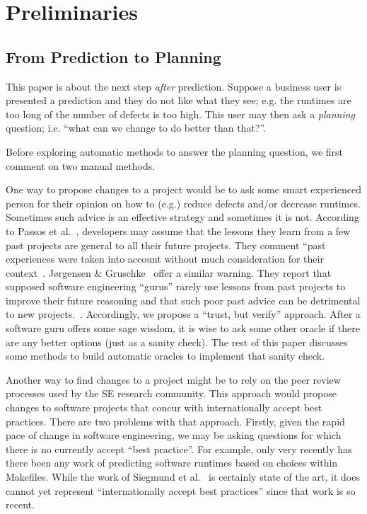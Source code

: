 \documentclass{sig-alternate}
\begin{document}
\section{Preliminaries}\label{sect:prelim}

\subsection{From Prediction to Planning}
 
 
This paper is about the next step {\em after} prediction. Suppose
a business user is presented a prediction and they do not like what they see; e.g. the runtimes are too long of the number of defects is too high. This user may
then ask a {\em planning}  question; i.e. ``what can we change to do better than that?''.

 

Before exploring automatic methods to answer the planning question, we first comment
on two manual methods.

One way to propose changes to a project would be to   ask some smart experienced
person for their opinion on how to (e.g.) reduce defects and/or decrease runtimes. Sometimes
such advice 
is an effective strategy and sometimes it is not.
According to Passos et al.~\cite{passos11},  developers
may  assume that the lessons they learn from a few past
projects are general to 
all their future projects. They comment ``past experiences were taken into account without 
much consideration for their context~\cite{passos11}.  
 J{\o}rgensen \& Gruschke~\cite{jorgensen09} offer  a similar warning. They report that 
  supposed software engineering    ``gurus'' rarely use lessons
  from past projects to improve their future reasoning and that such poor
  past advice can be detrimental to new projects.~\cite{jorgensen09}.
  Accordingly, we   propose a ``trust, but verify'' approach.
  After a software guru offers some sage wisdom,  it is wise to ask some other oracle 
  if there are any better options
  (just as a sanity check).
  The rest of this paper discusses some methods to build automatic oracles 
  to implement that   sanity check.
  
 
Another way  to find   changes to a project
might be to rely
on the peer review processes used by the 
SE research community. This approach would propose changes to software
projects that concur with internationally accept best practices. 
There are two
problems with that approach. Firstly, given the rapid pace of change in software
engineering, we may be asking questions for which there is no currently accept
``best practice''. For example, only very recently has there been any work
of predicting software runtimes based on choices within Makefiles. While the work
of Siegmund et al.~\cite{sven12} is certainly state of the art, it does
cannot yet represent ``internationally accept best practices'' since that work is so
recent. 
\end{document}
